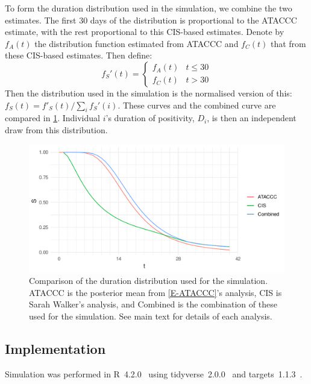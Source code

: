 \documentclass[thesis.tex]{subfiles}
\begin{document}
To form the duration distribution used in the simulation, we combine the two estimates.
The first 30 days of the distribution is proportional to the ATACCC estimate, with the rest proportional to this CIS-based estimates.
Denote by $f_A(t)$ the distribution function estimated from ATACCC and $f_C(t)$ that from these CIS-based estimates.
Then define:
$$
f_S'(t) = \begin{cases}
	f_A(t) &t \leq 30 \\
	f_C(t) &t > 30
\end{cases}
$$
Then the distribution used in the simulation is the normalised version of this: $f_S(t) = f'_S(t)/\sum_i f_S'(i)$.
These curves and the combined curve are compared in \cref{perf-test:fig:duration-dist}.
Individual $i$'s duration of positivity, $D_i$, is then an independent draw from this distribution.
\begin{figure}
  \centering \includegraphics{cis-perfect-testing/input-duration-dists}
  \caption[Comparison of duration distributions]{Comparison of the duration distribution used for the simulation. ATACCC is the posterior mean from \cref{E-ATACCC}'s analysis, CIS is Sarah Walker's analysis, and Combined is the combination of these used for the simulation. See main text for details of each analysis. \label{perf-test:fig:duration-dist}}
\end{figure}

\subsection{Implementation}

Simulation was performed in R~4.2.0~\autocite{R4-2-0} using tidyverse~2.0.0~\autocite{tidyverse} and targets~1.1.3~\autocite{targetsPackage}.
\end{document}
